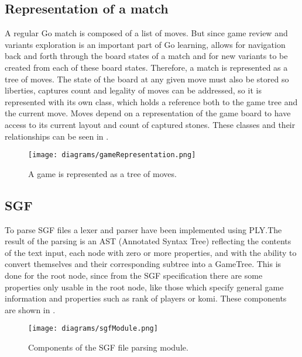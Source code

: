 \subsection{Representation of a match}

A regular Go match is composed of a list of moves. But since game review and
variants exploration is an important part of Go learning, \program{} allows for
navigation back and forth through the board states of a match and for new
variants to be created from each of these board states. Therefore, a match is
represented as a tree of moves. The state of the board at any given move must
also be stored so liberties, captures count and legality of moves can be
addressed, so it is represented with its own class, which holds a reference both
to the game tree and the current move. Moves depend on a representation of the
game board to have access to its current layout and count of captured stones.
These classes and their relationships can be seen in
.

\begin{figure}[h]
	\begin{center}
		\texttt{[image: diagrams/gameRepresentation.png]}
		\caption{A game is represented as a tree of moves.}\label{fig:gameRepresentation}
	\end{center}
\end{figure}

\subsection{SGF}

To parse SGF files a lexer and parser have been implemented using PLY.\@ The
result of the parsing is an AST (Annotated Syntax Tree) reflecting the contents
of the text input, each node with zero or more properties, and with the ability
to convert themselves and their corresponding subtree into a GameTree. This is
done for the root node, since from the SGF specification there are some
properties only usable in the root node, like those which specify general game
information and properties such as rank of players or komi. These components are
shown in .

\begin{figure}[h]
	\begin{center}
		\texttt{[image: diagrams/sgfModule.png]}
		\caption{Components of the SGF file parsing module.}\label{fig:sgfModule}
	\end{center}
\end{figure}
